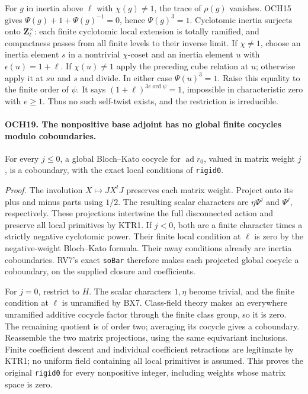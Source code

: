 For \(g\) in inertia above \(\ell\) with \(\chi(g)\ne1\),
the trace of \(\rho(g)\) vanishes.  OCH15 gives
\(\Psi(g)+1+\Psi(g)^{-1}=0\), hence \(\Psi(g)^3=1\).
Cyclotomic inertia surjects onto \(\mathbf Z_\ell^\times\):
each finite cyclotomic local extension is totally ramified, and
compactness passes from all finite levels to their inverse limit.
If \(\chi\ne1\), choose an inertia element \(s\) in a
nontrivial \(\chi\)-coset and an inertia element \(u\) with
\(\epsilon(u)=1+\ell\).  If \(\chi(u)\ne1\) apply the
preceding cube relation at \(u\); otherwise apply it at \(su\)
and \(s\) and divide.  In either case \(\Psi(u)^3=1\).
Raise this equality to the finite order of \(\psi\).  It says
\((1+\ell)^{3e\operatorname{ord}\psi}=1\), impossible
in characteristic zero with \(e\ge1\).  Thus no such
self-twist exists, and the restriction is irreducible.

\paragraph{OCH19. The nonpositive base adjoint has no global finite cocycles modulo coboundaries.}
\label{claim:OCH19}
For every \(j\le0\), a global Bloch--Kato cocycle for
\(\operatorname{ad}r_0\), valued in matrix weight \(j\),
is a coboundary, with the exact local conditions of \texttt{rigid0}.

\emph{Proof.}
The involution \(X\mapsto JX^tJ\) preserves each matrix
weight.  Project onto its plus and minus parts using \(1/2\).
The resulting scalar characters are \(\eta\Psi^j\) and
\(\Psi^j\), respectively.  These projections intertwine the
full disconnected action and preserve all local primitives by
KTR1.  If \(j<0\), both are a finite character times a
strictly negative cyclotomic power.  Their finite local condition
at \(\ell\) is zero by the negative-weight Bloch--Kato
formula.  Their away conditions already are inertia coboundaries.
RV7's exact \texttt{soBar} therefore makes each projected global
cocycle a coboundary, on the supplied closure and coefficients.

For \(j=0\), restrict to \(H\).  The scalar characters
\(1,\eta\) become trivial, and the finite condition at
\(\ell\) is unramified by BX7.  Class-field theory makes an
everywhere unramified additive cocycle factor through the finite
class group, so it is zero.  The remaining quotient is of order
two; averaging its cocycle gives a coboundary.  Reassemble the two
matrix projections, using the same equivariant inclusions.
Finite coefficient descent and individual coefficient retractions
are legitimate by KTR1; no uniform field containing all local
primitives is assumed.  This proves the original \texttt{rigid0}
for every nonpositive integer, including weights whose matrix
space is zero.

